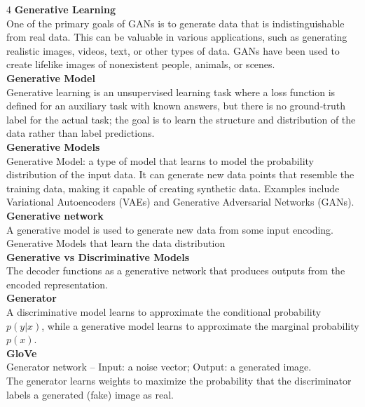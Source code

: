 \documentclass[8pt]{extarticle}
\begin{document}
\begin{multicols}{4}
\vspace{2pt}\textbf{Generative Learning}\\
One of the primary goals of GANs is to generate data that is indistinguishable from real data. This can be valuable in various applications, such as generating realistic images, videos, text, or other types of data. GANs have been used to create lifelike images of nonexistent people, animals, or scenes.\\
\vspace{2pt}\textbf{Generative Model}\\
Generative learning is an unsupervised learning task where a loss function is defined for an auxiliary task with known answers, but there is no ground‑truth label for the actual task; the goal is to learn the structure and distribution of the data rather than label predictions.\\
\vspace{2pt}\textbf{Generative Models}\\
Generative Model: a type of model that learns to model the probability distribution of the input data. It can generate new data points that resemble the training data, making it capable of creating synthetic data. Examples include Variational Autoencoders (VAEs) and Generative Adversarial Networks (GANs).\\
\vspace{2pt}\textbf{Generative network}\\
A generative model is used to generate new data from some input encoding.\\
Generative Models that learn the data distribution\\
\vspace{2pt}\textbf{Generative vs Discriminative Models}\\
The decoder functions as a generative network that produces outputs from the encoded representation.\\
\vspace{2pt}\textbf{Generator}\\
A discriminative model learns to approximate the conditional probability $p(y|x)$, while a generative model learns to approximate the marginal probability $p(x)$.\\
\vspace{2pt}\textbf{GloVe}\\
Generator network – Input: a noise vector; Output: a generated image.\\
The generator learns weights to maximize the probability that the discriminator labels a generated (fake) image as real.\\

\end{multicols}
\end{document}
